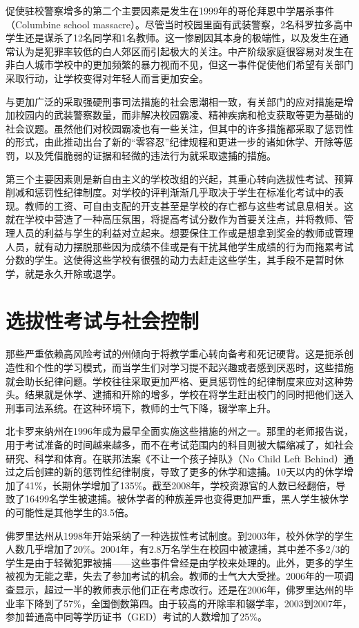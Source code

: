 \documentclass[fontset=fandol, a4paper, 12pt, openright]{ctexbook}
\begin{document}
促使驻校警察增多的第二个主要因素是发生在1999年的哥伦拜恩中学屠杀事件（Columbine school massacre）。尽管当时校园里面有武装警察，2名科罗拉多高中学生还是谋杀了12名同学和1名教师。这一惨剧因其本身的极端性，以及发生在通常认为是犯罪率较低的白人郊区而引起极大的关注。中产阶级家庭很容易对发生在非白人城市学校中的更加频繁的暴力视而不见，但这一事件促使他们希望有关部门采取行动，让学校变得对年轻人而言更加安全。

与更加广泛的采取强硬刑事司法措施的社会思潮相一致，有关部门的应对措施是增加校园内的武装警察数量，而非解决校园霸凌、精神疾病和枪支获取等更为基础的社会议题。虽然他们对校园霸凌也有一些关注，但其中的许多措施都采取了惩罚性的形式，由此推动出台了新的“零容忍”纪律规程和更进一步的诸如休学、开除等惩罚，以及凭借脆弱的证据和轻微的违法行为就采取逮捕的措施。

第三个主要因素则是新自由主义的学校改组的兴起，其重心转向选拔性考试、预算削减和惩罚性纪律制度。对学校的评判渐渐几乎取决于学生在标准化考试中的表现。教师的工资、可自由支配的开支甚至是学校的存亡都与这些考试息息相关。这就在学校中营造了一种高压氛围，将提高考试分数作为首要关注点，并将教师、管理人员的利益与学生的利益对立起来。想要保住工作或是想拿到奖金的教师或管理人员，就有动力摆脱那些因为成绩不佳或是有干扰其他学生成绩的行为而拖累考试分数的学生。这使得这些学校有很强的动力去赶走这些学生，其手段不是暂时休学，就是永久开除或退学。

\section{选拔性考试与社会控制}

那些严重依赖高风险考试的州倾向于将教学重心转向备考和死记硬背。这是扼杀创造性和个性的学习模式，而当学生们对学习提不起兴趣或者感到厌恶时，这些措施就会助长纪律问题。学校往往采取更加严格、更具惩罚性的纪律制度来应对这种势头。结果就是休学、逮捕和开除的增多，学校在将学生赶出校门的同时把他们送入刑事司法系统。在这种环境下，教师的士气下降，辍学率上升。

北卡罗来纳州在1996年成为最早全面实施这些措施的州之一。那里的老师报告说，用于考试准备的时间越来越多，而不在考试范围内的科目则被大幅缩减了，如社会研究、科学和体育。在联邦法案《不让一个孩子掉队》（No Child Left Behind）通过之后创建的新的惩罚性纪律制度，导致了更多的休学和逮捕。10天以内的休学增加了41\%，长期休学增加了135\%。截至2008年，学校资源官的人数已经翻倍，导致了16499名学生被逮捕。被休学者的种族差异也变得更加严重，黑人学生被休学的可能性是其他学生的3.5倍。

佛罗里达州从1998年开始采纳了一种选拔性考试制度。到2003年，校外休学的学生人数几乎增加了20\%。2004年，有2.8万名学生在校园中被逮捕，其中差不多2/3的学生是由于轻微犯罪被捕——这些事件曾经是由学校来处理的。此外，更多的学生被视为无能之辈，失去了参加考试的机会。教师的士气大大受挫。2006年的一项调查显示，超过一半的教师表示他们正在考虑改行。还是在2006年，佛罗里达州的毕业率下降到了57\%，全国倒数第四。由于较高的开除率和辍学率，2003到2007年，参加普通高中同等学历证书（GED）考试的人数增加了25\%。
\end{document}
